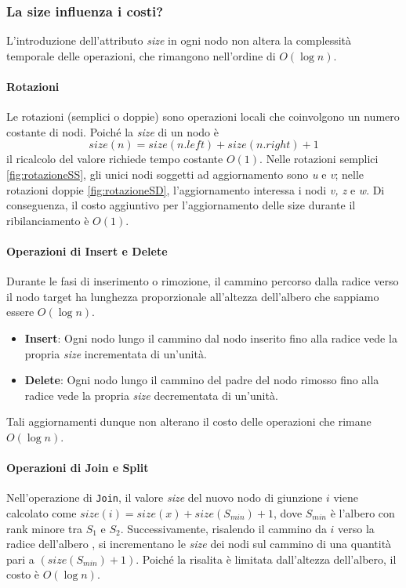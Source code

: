 \subsubsection{La size influenza i costi?}
L'introduzione dell'attributo \textit{size} in ogni nodo non altera la complessità temporale delle operazioni, che rimangono nell'ordine di $O(\log n)$.

\paragraph{Rotazioni}
Le rotazioni (semplici o doppie) sono operazioni locali che coinvolgono un numero costante di nodi. Poiché la \textit{size} di un nodo è
\[ size(n) = size(n.left) + size(n.right) + 1 \]
il ricalcolo del valore richiede tempo costante $O(1)$. Nelle rotazioni semplici \ref{fig:rotazioneSS}, gli unici nodi soggetti ad aggiornamento sono \textit{u} e \textit{v}; nelle rotazioni doppie \ref{fig:rotazioneSD}, l'aggiornamento interessa i nodi \textit{v, z} e \textit{w}. Di conseguenza, il costo aggiuntivo per l'aggiornamento delle size durante il ribilanciamento è $O(1)$.

\paragraph{Operazioni di Insert e Delete} 
Durante le fasi di inserimento o rimozione, il cammino percorso dalla radice verso il nodo target ha lunghezza proporzionale all'altezza dell'albero che sappiamo essere  $O(\log n)$. 
\begin{itemize}
    \item \textbf{Insert}: Ogni nodo lungo il cammino dal nodo inserito fino alla radice vede la propria \textit{size} incrementata di un'unità.
    \item \textbf{Delete}: Ogni nodo lungo il cammino del padre del nodo rimosso fino alla radice vede la propria \textit{size} decrementata di un'unità.
\end{itemize}
Tali aggiornamenti dunque non alterano il costo delle operazioni che rimane $O(\log n)$.

\paragraph{Operazioni di Join e Split} 
Nell'operazione di \texttt{Join}, il valore \textit{size} 
del nuovo nodo di giunzione $i$ viene calcolato come 
$size(i) = size(x)+ size(S_{min}) + 1 $, dove $S_{min}$ è 
l'albero con rank minore tra $S_1$ e $S_2$. Successivamente, 
risalendo il cammino da $i$ verso la radice dell'albero , 
si incrementano le \textit{size} dei nodi sul cammino di una 
quantità pari a $(size(S_{min}) + 1)$. Poiché la risalita è 
limitata dall'altezza dell'albero, il costo è $O(\log n)$.

